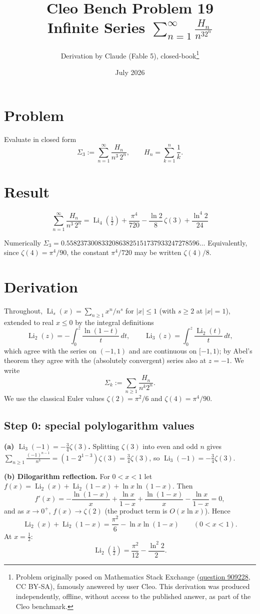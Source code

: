 \documentclass[11pt]{article}
\title{Cleo Bench Problem 19\\[1ex]\large Infinite Series $\sum_{n=1}^\infty\frac{H_n}{n^32^n}$}
\author{Derivation by Claude (Fable 5), closed-book\thanks{Problem originally
posed on Mathematics Stack Exchange
(\href{https://math.stackexchange.com/q/909228}{question 909228}, CC BY-SA),
famously answered by user Cleo. This derivation was produced independently,
offline, without access to the published answer, as part of the Cleo benchmark.}}
\date{July 2026}
\theoremstyle{remark}
\begin{document}
\maketitle

\section*{Problem}

Evaluate in closed form
$$\Sigma_3:=\sum_{n=1}^\infty\frac{H_n}{n^3\,2^n},\qquad H_n=\sum_{k=1}^n\frac1k .$$

\section*{Result}

$$\boxed{\;\sum_{n=1}^\infty\frac{H_n}{n^3\,2^n}
=\operatorname{Li}_4\!\left(\tfrac12\right)+\frac{\pi^4}{720}-\frac{\ln 2}{8}\,\zeta(3)+\frac{\ln^4 2}{24}\;}
$$

Numerically $\Sigma_3 = 0.55823730083320863825151737933247278596\ldots$ Equivalently, since $\zeta(4)=\pi^4/90$, the constant $\pi^4/720$ may be written $\zeta(4)/8$.

\section*{Derivation}

Throughout, $\operatorname{Li}_s(x)=\sum_{n\ge1}x^n/n^s$ for $|x|\le 1$ (with $s\ge2$ at $|x|=1$), extended to real $x\le 0$ by the integral definitions
$$\operatorname{Li}_2(z)=-\int_0^z\frac{\ln(1-t)}{t}\,dt,\qquad \operatorname{Li}_3(z)=\int_0^z\frac{\operatorname{Li}_2(t)}{t}\,dt ,$$
which agree with the series on $(-1,1)$ and are continuous on $[-1,1)$; by Abel's theorem they agree with the (absolutely convergent) series also at $z=-1$. We write
$$\Sigma_k:=\sum_{n\ge1}\frac{H_n}{n^k2^n}.$$
We use the classical Euler values $\zeta(2)=\pi^2/6$ and $\zeta(4)=\pi^4/90$.

\subsection*{Step 0: special polylogarithm values}

\textbf{(a) $\operatorname{Li}_3(-1)=-\tfrac34\zeta(3)$.} Splitting $\zeta(3)$ into even and odd $n$ gives $\sum_{n\ge1}\frac{(-1)^{n-1}}{n^3}=(1-2^{1-3})\zeta(3)=\tfrac34\zeta(3)$, so $\operatorname{Li}_3(-1)=-\tfrac34\zeta(3)$.

\textbf{(b) Dilogarithm reflection.} For $0<x<1$ let $f(x)=\operatorname{Li}_2(x)+\operatorname{Li}_2(1-x)+\ln x\ln(1-x)$. Then
$$f'(x)=-\frac{\ln(1-x)}{x}+\frac{\ln x}{1-x}+\frac{\ln(1-x)}{x}-\frac{\ln x}{1-x}=0 ,$$
and as $x\to0^+$, $f(x)\to \zeta(2)$ (the product term is $O(x\ln x)$). Hence
\begin{equation}\operatorname{Li}_2(x)+\operatorname{Li}_2(1-x)=\frac{\pi^2}{6}-\ln x\ln(1-x)\qquad(0<x<1). \tag{0.1}\end{equation}
At $x=\tfrac12$:
\begin{equation}\operatorname{Li}_2\!\left(\tfrac12\right)=\frac{\pi^2}{12}-\frac{\ln^2 2}{2}. \tag{0.2}\end{equation}
\end{document}
